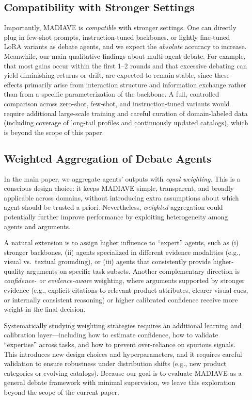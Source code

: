 \documentclass[11pt]{article}
\newcommand{\modelname}{MADIAVE}
\begin{document}
\subsection{Compatibility with Stronger Settings}
Importantly, \textsc{\modelname} is \emph{compatible} with stronger settings. One can directly plug in few-shot prompts, instruction-tuned backbones, or lightly fine-tuned LoRA variants as debate agents, and we expect the \emph{absolute} accuracy to increase. Meanwhile, our main qualitative findings about multi-agent debate. For example, that most gains occur within the first 1--2 rounds and that excessive debating can yield diminishing returns or drift, are expected to remain stable, since these effects primarily arise from interaction structure and information exchange rather than from a specific parameterization of the backbone. A full, controlled comparison across zero-shot, few-shot, and instruction-tuned variants would require additional large-scale training and careful curation of domain-labeled data (including coverage of long-tail profiles and continuously updated catalogs), which is beyond the scope of this paper. 

\subsection{Weighted Aggregation of Debate Agents}
\label{app:weighted_aggregation}

In the main paper, we aggregate agents' outputs with \emph{equal weighting}. This is a conscious design choice: it keeps \textsc{\modelname} simple, transparent, and broadly applicable across domains, without introducing extra assumptions about which agent should be trusted a priori. Nevertheless, \emph{weighted} aggregation could potentially further improve performance by exploiting heterogeneity among agents and arguments.

A natural extension is to assign higher influence to ``expert'' agents, such as (i) stronger backbones, (ii) agents specialized in different evidence modalities (e.g., visual vs.\ textual grounding), or (iii) agents that consistently provide higher-quality arguments on specific task subsets. Another complementary direction is \emph{confidence- or evidence-aware} weighting, where arguments supported by stronger evidence (e.g., explicit citations to relevant product attributes, clearer visual cues, or internally consistent reasoning) or higher calibrated confidence receive more weight in the final decision.

Systematically studying weighting strategies requires an additional learning and calibration layer---including how to estimate confidence, how to validate ``expertise'' across tasks, and how to prevent over-reliance on spurious signals. This introduces new design choices and hyperparameters, and it requires careful validation to ensure robustness under distribution shifts (e.g., new product categories or evolving catalogs). Because our goal is to evaluate \textsc{\modelname} as a general debate framework with minimal supervision, we leave this exploration beyond the scope of the current paper.
\end{document}
